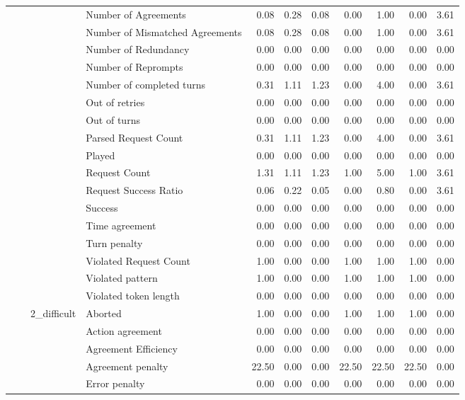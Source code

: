 \begin{tabular}{llllrrrrrrr}
 &  &  & Number of Agreements & 0.08 & 0.28 & 0.08 & 0.00 & 1.00 & 0.00 & 3.61 \\
 &  &  & Number of Mismatched Agreements & 0.08 & 0.28 & 0.08 & 0.00 & 1.00 & 0.00 & 3.61 \\
 &  &  & Number of Redundancy & 0.00 & 0.00 & 0.00 & 0.00 & 0.00 & 0.00 & 0.00 \\
 &  &  & Number of Reprompts & 0.00 & 0.00 & 0.00 & 0.00 & 0.00 & 0.00 & 0.00 \\
 &  &  & Number of completed turns & 0.31 & 1.11 & 1.23 & 0.00 & 4.00 & 0.00 & 3.61 \\
 &  &  & Out of retries & 0.00 & 0.00 & 0.00 & 0.00 & 0.00 & 0.00 & 0.00 \\
 &  &  & Out of turns & 0.00 & 0.00 & 0.00 & 0.00 & 0.00 & 0.00 & 0.00 \\
 &  &  & Parsed Request Count & 0.31 & 1.11 & 1.23 & 0.00 & 4.00 & 0.00 & 3.61 \\
 &  &  & Played & 0.00 & 0.00 & 0.00 & 0.00 & 0.00 & 0.00 & 0.00 \\
 &  &  & Request Count & 1.31 & 1.11 & 1.23 & 1.00 & 5.00 & 1.00 & 3.61 \\
 &  &  & Request Success Ratio & 0.06 & 0.22 & 0.05 & 0.00 & 0.80 & 0.00 & 3.61 \\
 &  &  & Success & 0.00 & 0.00 & 0.00 & 0.00 & 0.00 & 0.00 & 0.00 \\
 &  &  & Time agreement & 0.00 & 0.00 & 0.00 & 0.00 & 0.00 & 0.00 & 0.00 \\
 &  &  & Turn penalty & 0.00 & 0.00 & 0.00 & 0.00 & 0.00 & 0.00 & 0.00 \\
 &  &  & Violated Request Count & 1.00 & 0.00 & 0.00 & 1.00 & 1.00 & 1.00 & 0.00 \\
 &  &  & Violated pattern & 1.00 & 0.00 & 0.00 & 1.00 & 1.00 & 1.00 & 0.00 \\
 &  &  & Violated token length & 0.00 & 0.00 & 0.00 & 0.00 & 0.00 & 0.00 & 0.00 \\
\cline{3-11}
 &  & \multirow[t]{27}{*}{2_difficult} & Aborted & 1.00 & 0.00 & 0.00 & 1.00 & 1.00 & 1.00 & 0.00 \\
 &  &  & Action agreement & 0.00 & 0.00 & 0.00 & 0.00 & 0.00 & 0.00 & 0.00 \\
 &  &  & Agreement Efficiency & 0.00 & 0.00 & 0.00 & 0.00 & 0.00 & 0.00 & 0.00 \\
 &  &  & Agreement penalty & 22.50 & 0.00 & 0.00 & 22.50 & 22.50 & 22.50 & 0.00 \\
 &  &  & Error penalty & 0.00 & 0.00 & 0.00 & 0.00 & 0.00 & 0.00 & 0.00 \\

\end{tabular}
